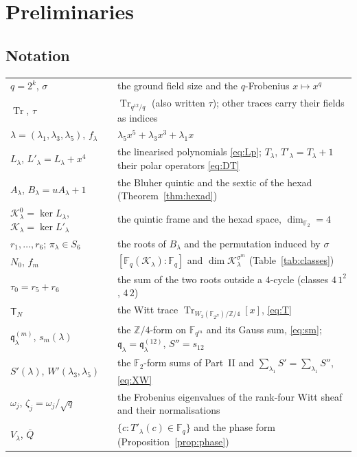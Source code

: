 \documentclass[12pt,a4paper]{amsart}
\theoremstyle{definition}
\newcommand{\F}{\mathbb{F}}
\newcommand{\Z}{\mathbb{Z}}
\newcommand{\Tr}{\operatorname{Tr}}
\newcommand{\Kk}{\mathcal{K}}
\newcommand{\qq}{\mathfrak{q}}
\newcommand{\Spp}{S''}
\begin{document}
\section{Preliminaries}\label{sec:prelim}

\subsection{Notation}
\begin{center}\small
\begin{tabular}{@{}p{}p{}@{}}
\toprule
$q=2^k$, $\sigma$ & the ground field size and the $q$-Frobenius $x\mapsto x^q$\\
$\Tr$, $\tau$ & $\Tr_{q^{12}/q}$ (also written $\tau$); other traces carry their fields as indices\\
$\lambda=(\lambda_1,\lambda_3,\lambda_5)$, $f_\lambda$ & $\lambda_5x^5+\lambda_3x^3+\lambda_1x$\\
$L_\lambda$, $L'_\lambda=L_\lambda+x^4$ & the linearised polynomials \eqref{eq:Lp}; $T_\lambda$, $T'_\lambda=T_\lambda+1$ their polar operators \eqref{eq:DT}\\
$A_\lambda$, $B_\lambda=uA_\lambda+1$ & the Bluher quintic and the sextic of the hexad (Theorem~\ref{thm:hexad})\\
$\Kk^0_\lambda=\ker L_\lambda$, $\Kk_\lambda=\ker L'_\lambda$ & the quintic frame and the hexad space, $\dim_{\F_2}=4$\\
$r_1,\dots,r_6$; $\pi_\lambda\in S_6$ & the roots of $B_\lambda$ and the permutation induced by $\sigma$\\
$N_0$, $f_m$ & $[\F_q(\Kk_\lambda):\F_q]$ and $\dim\Kk_\lambda^{\sigma^m}$ (Table~\ref{tab:classes})\\
$\tau_0=r_5+r_6$ & the sum of the two roots outside a $4$-cycle (classes $4\,1^2$, $4\,2$)\\
$\mathsf T_N$ & the Witt trace $\Tr_{W_2(\F_{2^N})/\Z/4}[x]$, \eqref{eq:T}\\
$\qq^{(m)}_\lambda$, $s_m(\lambda)$ & the $\Z/4$-form on $\F_{q^m}$ and its Gauss sum, \eqref{eq:sm}; $\qq_\lambda=\qq^{(12)}_\lambda$, $\Spp=s_{12}$\\
$S'(\lambda)$, $W'(\lambda_3,\lambda_5)$ & the $\F_2$-form sums of Part~II and $\sum_{\lambda_1}S'=\sum_{\lambda_1}\Spp$, \eqref{eq:XW}\\
$\omega_j$, $\zeta_j=\omega_j/\sqrt q$ & the Frobenius eigenvalues of the rank-four Witt sheaf and their normalisations\\
$V_\lambda$, $\bar Q$ & $\{c:T'_\lambda(c)\in\F_q\}$ and the phase form (Proposition~\ref{prop:phase})\\
\bottomrule
\end{tabular}
\end{center}
\end{document}
